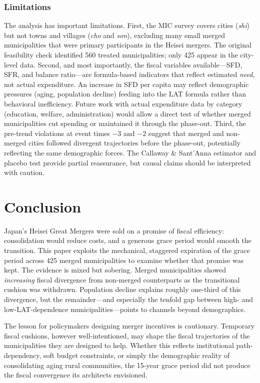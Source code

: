 \documentclass[12pt]{article}
\begin{document}
\subsubsection*{Limitations} The analysis has important limitations. First, the MIC survey covers cities (\textit{shi}) but not towns and villages (\textit{cho} and \textit{son}), excluding many small merged municipalities that were primary participants in the Heisei mergers. The original feasibility check identified 560 treated municipalities; only 425 appear in the city-level data. Second, and most importantly, the fiscal variables available---SFD, SFR, and balance ratio---are formula-based indicators that reflect estimated \emph{need}, not actual expenditure. An increase in SFD per capita may reflect demographic pressures (aging, population decline) feeding into the LAT formula rather than behavioral inefficiency. Future work with actual expenditure data by category (education, welfare, administration) would allow a direct test of whether merged municipalities cut spending or maintained it through the phase-out. Third, the pre-trend violations at event times $-3$ and $-2$ suggest that merged and non-merged cities followed divergent trajectories before the phase-out, potentially reflecting the same demographic forces. The Callaway \& Sant'Anna estimator and placebo test provide partial reassurance, but causal claims should be interpreted with caution.

\section{Conclusion}

Japan's Heisei Great Mergers were sold on a promise of fiscal efficiency: consolidation would reduce costs, and a generous grace period would smooth the transition. This paper exploits the mechanical, staggered expiration of the grace period across 425 merged municipalities to examine whether that promise was kept. The evidence is mixed but sobering. Merged municipalities showed \emph{increasing} fiscal divergence from non-merged counterparts as the transitional cushion was withdrawn. Population decline explains roughly one-third of this divergence, but the remainder---and especially the tenfold gap between high- and low-LAT-dependence municipalities---points to channels beyond demographics.

The lesson for policymakers designing merger incentives is cautionary. Temporary fiscal cushions, however well-intentioned, may shape the fiscal trajectories of the municipalities they are designed to help. Whether this reflects institutional path-dependency, soft budget constraints, or simply the demographic reality of consolidating aging rural communities, the 15-year grace period did not produce the fiscal convergence its architects envisioned.
\end{document}
